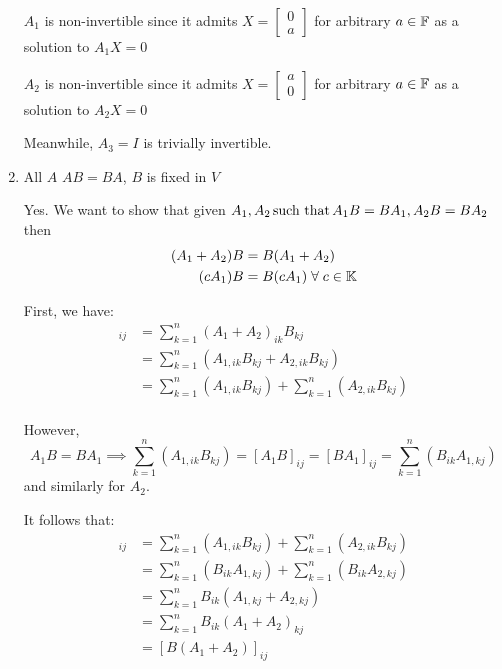 \documentclass[a4paper, 11pt]{article}
\begin{document}
\begin{solution}
\begin{enumerate}
              \(A_1\) is non-invertible since it admits \(X = \left[\begin{array}{c}
                      0 \\ a
                  \end{array}\right]\) for arbitrary \(a \in \mathbb{F}\) as a solution to \(A_1X = 0\)

              \(A_2\) is non-invertible since it admits \(X = \left[\begin{array}{c}
                      a \\ 0
                  \end{array}\right]\) for arbitrary \(a \in \mathbb{F}\) as a solution to \(A_2X = 0\)

              Meanwhile, \(A_3 = I\) is trivially invertible.

        \item All \(A\) \st \(AB = BA\), \(B\) is fixed in \(V\)

              Yes. We want to show that given \(A_1, A_2 \,\text{such that}\, A_1B = BA_1, A_2B = BA_2\) then
              \begin{align*}
                  (A_1 + A_2)B & = B(A_1 + A_2)                 \\
                  (c A_1) B    & = B (c A_1) \forall c \in \bbk
              \end{align*}

              First, we have:
              \begin{align*}
                  [(A_1 + A_2)B]_{ij} & = \sum_{k=1}^{n}(A_1 + A_2)_{ik}B_{kj}                              \\
                                      & = \sum_{k=1}^{n}(A_{1, ik}B_{kj} + A_{2, ik}B_{kj})                 \\
                                      & = \sum_{k=1}^{n}(A_{1, ik}B_{kj}) + \sum_{k=1}^{n}(A_{2, ik}B_{kj}) \\
              \end{align*}

              However, \[
                  A_1B = BA_1 \implies \sum_{k=1}^{n}(A_{1, ik}B_{kj}) = [A_1B]_{ij} = [BA_1]_{ij} = \sum_{k=1}^{n}(B_{ik}A_{1, kj})
              \]
              and similarly for \(A_2\).

              It follows that:
              \begin{align*}
                  [(A_1 + A_2)B]_{ij} & =\sum_{k=1}^{n}(A_{1, ik}B_{kj}) + \sum_{k=1}^{n}(A_{2, ik}B_{kj})  \\
                                      & = \sum_{k=1}^{n}(B_{ik}A_{1, kj}) + \sum_{k=1}^{n}(B_{ik}A_{2, kj}) \\
                                      & = \sum_{k=1}^{n}B_{ik}(A_{1, kj} + A_{2, kj})                       \\
                                      & = \sum_{k=1}^{n}B_{ik}(A_1 + A_2)_{kj}                              \\
                                      & = [B(A_1 + A_2)]_{ij}
              \end{align*}


\end{enumerate}
\end{solution}
\end{document}
